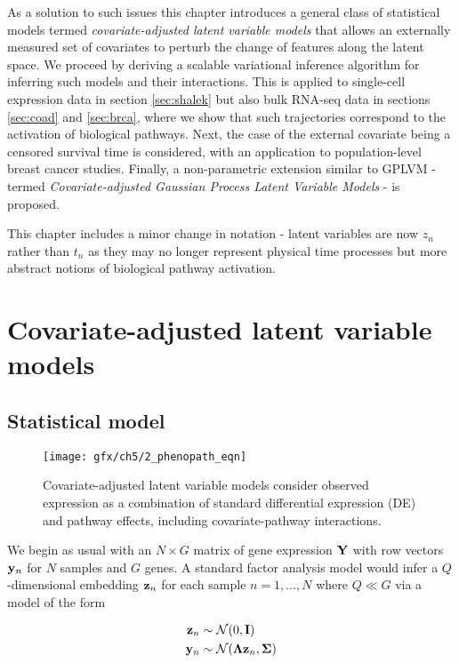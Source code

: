 As a solution to such issues this chapter introduces a general class of statistical models termed \emph{covariate-adjusted latent variable models} that allows an externally measured set of covariates to perturb the change of features along the latent space. We proceed by deriving a scalable variational inference algorithm for inferring such models and their interactions. This is applied to single-cell expression data in section \ref{sec:shalek} but also bulk RNA-seq data in sections \ref{sec:coad} and \ref{sec:brca}, where we show that such trajectories correspond to the activation of biological pathways. Next, the case of the external covariate being a censored survival time is considered, with an application to population-level breast cancer studies. Finally, a non-parametric extension similar to GPLVM - termed \emph{Covariate-adjusted Gaussian Process Latent Variable Models} - is proposed.

This chapter includes a minor change in notation - latent variables are now $z_n$ rather than $t_n$ as they may no longer represent physical time processes but more abstract notions of biological pathway activation.

\section{Covariate-adjusted latent variable models}

\subsection{Statistical model}

\begin{figure}
\centering
  \texttt{[image: gfx/ch5/2\_phenopath\_eqn]}
  \caption{Covariate-adjusted latent variable models consider observed expression as a combination of standard differential expression (DE) and pathway effects, including covariate-pathway interactions.
  } \label{fig:phenopath_eqn}
\end{figure}

We begin as usual with an $N \times G$ matrix of gene expression $\mathbf{Y}$ with row vectors $\mathbf{y}_n$ for $N$ samples and $G$ genes. A standard factor analysis model would infer a $Q$-dimensional embedding $\mathbf{z}_n$ for each sample $n = 1, \ldots, N$ where $Q \ll G$ via a model of the form

\begin{equation}
  \begin{aligned}
\mathbf{z}_n & \sim \mathcal{N}(0, \mathbf{I}) \\
\mathbf{y}_n & \sim \mathcal{N}(\bm{\Lambda} \mathbf{z}_n, \bm{\Sigma})
  \end{aligned}
\end{equation}

